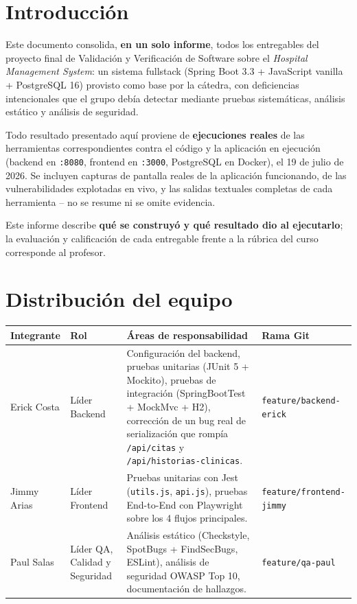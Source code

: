 \documentclass[11pt,a4paper]{article}
\begin{document}
\section{Introducci\'on}

Este documento consolida, \textbf{en un solo informe}, todos los entregables
del proyecto final de Validaci\'on y Verificaci\'on de Software sobre el
\emph{Hospital Management System}: un sistema fullstack (Spring Boot 3.3 +
JavaScript vanilla + PostgreSQL 16) provisto como base por la c\'atedra, con
deficiencias intencionales que el grupo deb\'ia detectar mediante pruebas
sistem\'aticas, an\'alisis est\'atico y an\'alisis de seguridad.

Todo resultado presentado aqu\'i proviene de \textbf{ejecuciones reales} de
las herramientas correspondientes contra el c\'odigo y la aplicaci\'on en
ejecuci\'on (backend en \texttt{:8080}, frontend en \texttt{:3000},
PostgreSQL en Docker), el 19 de julio de 2026. Se incluyen capturas de
pantalla reales de la aplicaci\'on funcionando, de las vulnerabilidades
explotadas en vivo, y las salidas textuales completas de cada herramienta --
no se resume ni se omite evidencia.

Este informe describe \textbf{qu\'e se construy\'o y qu\'e resultado dio al
ejecutarlo}; la evaluaci\'on y calificaci\'on de cada entregable frente a la
r\'ubrica del curso corresponde al profesor.

\section{Distribuci\'on del equipo}

\begin{longtable}{@{}p{2.5cm}p{3cm}p{6.3cm}p{2cm}@{}}
\toprule
\textbf{Integrante} & \textbf{Rol} & \textbf{\'Areas de responsabilidad} & \textbf{Rama Git} \\
\midrule
\endhead
Erick Costa & L\'ider Backend &
  Configuraci\'on del backend, pruebas unitarias (JUnit 5 + Mockito),
  pruebas de integraci\'on (SpringBootTest + MockMvc + H2), correcci\'on de
  un bug real de serializaci\'on que romp\'ia \texttt{/api/citas} y
  \texttt{/api/historias-clinicas}. &
  \texttt{feature/backend-erick} \\
Jimmy Arias & L\'ider Frontend &
  Pruebas unitarias con Jest (\texttt{utils.js}, \texttt{api.js}), pruebas
  End-to-End con Playwright sobre los 4 flujos principales. &
  \texttt{feature/frontend-jimmy} \\
Paul Salas & L\'ider QA, Calidad y Seguridad &
  An\'alisis est\'atico (Checkstyle, SpotBugs + FindSecBugs, ESLint),
  an\'alisis de seguridad OWASP Top 10, documentaci\'on de hallazgos. &
  \texttt{feature/qa-paul} \\
\bottomrule
\end{longtable}
\end{document}
